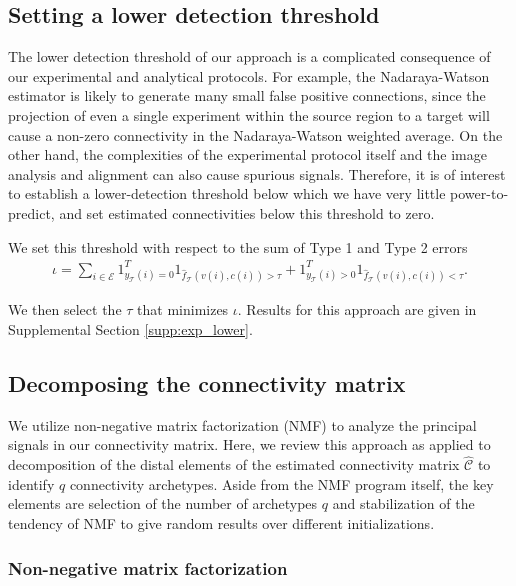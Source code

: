 \newpage

\subsection{Setting a lower detection threshold}
\label{supp_sec:methods_lower}

The lower detection threshold of our approach is a complicated consequence of our experimental and analytical protocols.
For example, the Nadaraya-Watson estimator is likely to generate many small false positive connections, since the projection of even a single experiment within the source region to a target will cause a non-zero connectivity in the Nadaraya-Watson weighted average.
On the other hand, the complexities of the experimental protocol itself and the image analysis and alignment can also cause spurious signals.
Therefore, it is of interest to establish a lower-detection threshold below which we have very little power-to-predict, and set estimated connectivities below this threshold to zero.

We set this threshold with respect to the sum of Type 1 and Type 2 errors
\begin{eqnarray*}
\iota = \sum_{i \in \mathcal E} 1_{y_{\mathcal T}(i) = 0}^T 1_{\hat f_{\mathcal T}(v(i),c(i)) > \tau} + 1_{y_{\mathcal T}(i) > 0}^T 1_{\hat f_{\mathcal T}(v(i),c(i)) < \tau}  .
\end{eqnarray*}

We then select the $\tau$ that minimizes $\iota$.
Results for this approach are given in Supplemental Section \ref{supp:exp_lower}.

\newpage

\subsection{Decomposing the connectivity matrix}
\label{supp_sec:matrix_factor_methods}

We utilize non-negative matrix factorization (NMF) to analyze the principal signals in our connectivity matrix.
Here, we review this approach as applied to decomposition of the distal elements of the estimated connectivity matrix $\widehat {\mathcal C}$ to identify $q$ connectivity archetypes.
Aside from the NMF program itself, the key elements are selection of the number of archetypes $q$ and stabilization of the tendency of NMF to give random results over different initializations. 

\subsubsection{Non-negative matrix factorization}

